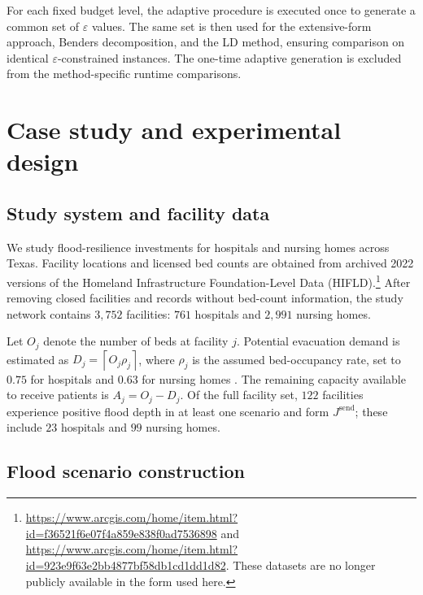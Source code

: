 \documentclass[preprint,11pt,authoryear]{elsarticle}
\begin{document}
For each fixed budget level, the adaptive procedure is executed once to
generate a common set of $\varepsilon$ values. The same set is then used for
the extensive-form approach, Benders decomposition, and the LD method,
ensuring comparison on identical $\varepsilon$-constrained instances. The
one-time adaptive generation is excluded from the method-specific runtime
comparisons.

\section{Case study and experimental design}
\label{sec:case_study_experimental_design}

\subsection{Study system and facility data}
\label{sec:facility_data}

We study flood-resilience investments for hospitals and nursing homes across
Texas. Facility locations and licensed bed counts are obtained from archived
2022 versions of the Homeland Infrastructure Foundation-Level Data
(HIFLD).\footnote{\url{https://www.arcgis.com/home/item.html?id=f36521f6e07f4a859e838f0ad7536898}
and
\url{https://www.arcgis.com/home/item.html?id=923e9f63e2bb4877bf58db1cd1dd1d82}.
These datasets are no longer publicly available in the form used here.}
After removing closed facilities and records without bed-count information,
the study network contains $3{,}752$ facilities: $761$ hospitals and $2{,}991$
nursing homes.

Let $O_j$ denote the number of beds at facility $j$. Potential evacuation
demand is estimated as
$D_j=\left\lceil O_j\rho_j\right\rceil$, where $\rho_j$ is the assumed bed-occupancy rate, set to $0.75$ for hospitals and $0.63$ for nursing homes
\citep{cdc_hospital_occupancy,tx_hhsc_nursing_occupancy}. The remaining capacity available to receive patients is $A_j=O_j-D_j$. Of the full facility set, $122$ facilities experience positive flood depth in
at least one scenario and form $J^{\mathrm{send}}$; these include $23$
hospitals and $99$ nursing homes. 

\subsection{Flood scenario construction}
\label{sec:scenario_generation}
\end{document}
